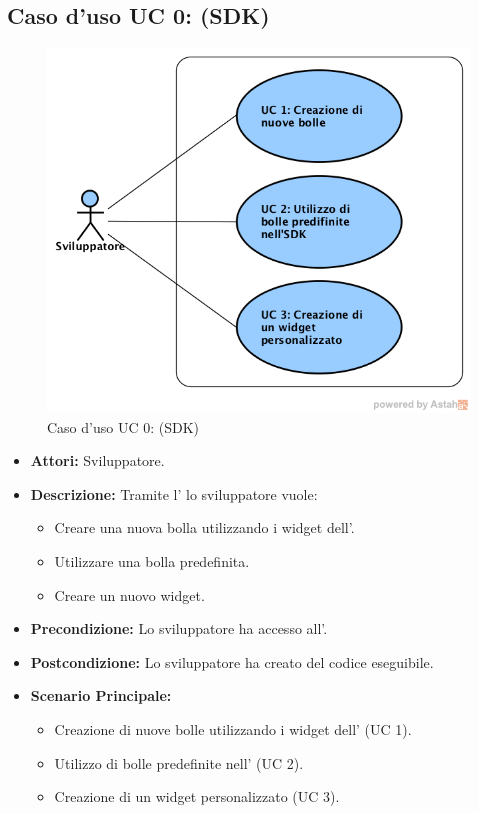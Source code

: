 \FloatBarrier
\subsection{Caso d'uso UC 0: \progetto (SDK)}
\label{Caso d'uso UC 0: \progetto (SDK)}
\begin{figure}[ht]
	\centering
	\includegraphics[scale=0.5]{Usecases/img/Monolith.png}
	\caption{Caso d'uso UC 0: \progetto(SDK)}
\end{figure}

\FloatBarrier
\begin{itemize}
\item \textbf{Attori:} Sviluppatore.
\item \textbf{Descrizione:} Tramite l' lo sviluppatore vuole:
	\begin{itemize}
	\item{Creare una nuova bolla utilizzando i widget dell'.}
	\item{Utilizzare una bolla predefinita.}
	\item{Creare un nuovo widget.}
	\end{itemize}
\item \textbf{Precondizione:} Lo sviluppatore ha accesso all'.
\item \textbf{Postcondizione:} Lo sviluppatore ha creato del codice eseguibile.
\item \textbf{Scenario Principale:}
	\begin{itemize}
	\item{Creazione di nuove bolle utilizzando i widget dell' (UC 1).}
	\item{Utilizzo di bolle predefinite nell' (UC 2).}
	\item{Creazione di un widget personalizzato (UC 3).}
	\end{itemize}
\end{itemize}